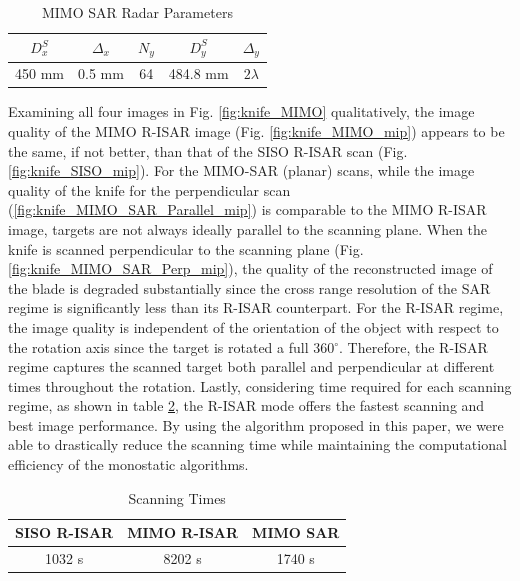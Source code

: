 \documentclass[conference]{IEEEtran}
\begin{document}
		\begin{table} [h]
			\caption{\label{table_SARradar_parameters}MIMO SAR Radar Parameters}
			\centering
			\begin{tabular}{c c c c c}
				\hline
				$D^S_x$ & $\Delta_x$ & $N_y$ & $D^S_y$ & $\Delta_y$  \\ [0.5ex] 
				\hline\hline
				450 mm & 0.5 mm & 64 & 484.8 mm & $2\lambda$ \\ 
				\hline
			\end{tabular}
		\end{table}
		
		Examining all four images in Fig. \ref{fig:knife_MIMO} qualitatively, the image quality of the MIMO R-ISAR image (Fig. \ref{fig:knife_MIMO_mip}) appears to be the same, if not better, than that of the SISO R-ISAR scan (Fig. \ref{fig:knife_SISO_mip}). For the MIMO-SAR (planar) scans, while the image quality of the knife for the perpendicular scan (\ref{fig:knife_MIMO_SAR_Parallel_mip}) is comparable to the MIMO R-ISAR image, targets are not always ideally parallel to the scanning plane. When the knife is scanned perpendicular to the scanning plane (Fig. \ref{fig:knife_MIMO_SAR_Perp_mip}), the quality of the reconstructed image of the blade is degraded substantially since the cross range resolution of the SAR regime is significantly less than its R-ISAR counterpart. For the R-ISAR regime, the image quality is independent of the orientation of the object with respect to the rotation axis since the target is rotated a full 360$^\circ$. Therefore, the R-ISAR regime captures the scanned target both parallel and perpendicular at different times throughout the rotation. Lastly, considering time required for each scanning regime, as shown in table \ref{table_scanning_times}, the R-ISAR mode offers the fastest scanning and best image performance. By using the algorithm proposed in this paper, we were able to drastically reduce the scanning time while maintaining the computational efficiency of the monostatic algorithms.
		
		\begin{table} [h]
			\caption{\label{table_scanning_times}Scanning Times}
			\centering
			\begin{tabular}{c c c}
				\hline
				SISO R-ISAR & MIMO R-ISAR & MIMO SAR  \\ [0.5ex] 
				\hline
			    1032 s & 8202 s & 1740 s\\
				\hline
			\end{tabular}
		\end{table}
				
\end{document}
